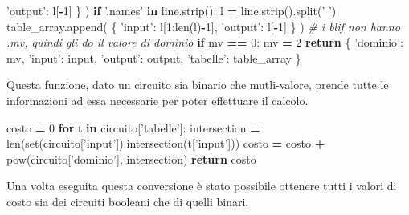 \documentclass[italian,]{book}
\newenvironment{Shaded}{\begin{snugshade}}{\end{snugshade}}
\newcommand{\BuiltInTok}[1]{#1}
\newcommand{\CommentTok}[1]{\textcolor[rgb]{0.56,0.35,0.01}{\textit{#1}}}
\newcommand{\ControlFlowTok}[1]{\textcolor[rgb]{0.13,0.29,0.53}{\textbf{#1}}}
\newcommand{\DecValTok}[1]{\textcolor[rgb]{0.00,0.00,0.81}{#1}}
\newcommand{\KeywordTok}[1]{\textcolor[rgb]{0.13,0.29,0.53}{\textbf{#1}}}
\newcommand{\NormalTok}[1]{#1}
\newcommand{\OperatorTok}[1]{\textcolor[rgb]{0.81,0.36,0.00}{\textbf{#1}}}
\newcommand{\StringTok}[1]{\textcolor[rgb]{0.31,0.60,0.02}{#1}}
\begin{document}
\begin{Shaded}
\begin{Highlighting}[]
          \StringTok{'output'}\NormalTok{:   l[}\OperatorTok{-}\DecValTok{1}\NormalTok{]}
\NormalTok{        \}}
\NormalTok{      )}
    \ControlFlowTok{if} \StringTok{'.names'} \KeywordTok{in}\NormalTok{ line.strip():}
\NormalTok{      l }\OperatorTok{=}\NormalTok{ line.strip().split(}\StringTok{' '}\NormalTok{)}
\NormalTok{      table_array.append(}
\NormalTok{        \{}
          \StringTok{'input'}\NormalTok{:    l[}\DecValTok{1}\NormalTok{:}\BuiltInTok{len}\NormalTok{(l)}\OperatorTok{-}\DecValTok{1}\NormalTok{],}
          \StringTok{'output'}\NormalTok{:   l[}\OperatorTok{-}\DecValTok{1}\NormalTok{]}
\NormalTok{        \}}
\NormalTok{      )}
  \CommentTok{# i blif non hanno .mv, quindi gli do il valore di dominio}
  \ControlFlowTok{if}\NormalTok{ mv }\OperatorTok{==} \DecValTok{0}\NormalTok{:}
\NormalTok{    mv }\OperatorTok{=} \DecValTok{2}
  \ControlFlowTok{return}\NormalTok{ \{}
    \StringTok{'dominio'}\NormalTok{:   mv,}
    \StringTok{'input'}\NormalTok{:    }\BuiltInTok{input}\NormalTok{,}
    \StringTok{'output'}\NormalTok{:   output,}
    \StringTok{'tabelle'}\NormalTok{:  table_array}
\NormalTok{  \}}
\end{Highlighting}
\end{Shaded}

\newpage

Questa funzione, dato un circuito sia binario che mutli-valore, prende tutte le informazioni ad essa necessarie per poter effettuare il calcolo.

\begin{Shaded}
\begin{Highlighting}[]
\NormalTok{costo }\OperatorTok{=} \DecValTok{0}
\ControlFlowTok{for}\NormalTok{ t }\KeywordTok{in}\NormalTok{ circuito[}\StringTok{'tabelle'}\NormalTok{]:}
\NormalTok{  intersection }\OperatorTok{=} \BuiltInTok{len}\NormalTok{(}\BuiltInTok{set}\NormalTok{(circuito[}\StringTok{'input'}\NormalTok{]).intersection(t[}\StringTok{'input'}\NormalTok{]))}
\NormalTok{  costo }\OperatorTok{=}\NormalTok{ costo }\OperatorTok{+} \BuiltInTok{pow}\NormalTok{(circuito[}\StringTok{'dominio'}\NormalTok{], intersection)}
\ControlFlowTok{return}\NormalTok{ costo}
\end{Highlighting}
\end{Shaded}

Una volta eseguita questa conversione è stato possibile ottenere tutti i valori di costo sia dei circuiti booleani che di quelli binari.
\end{document}
